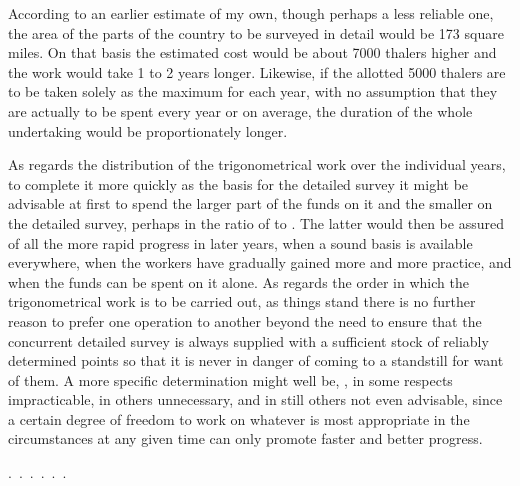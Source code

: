 According to an earlier estimate of my own, though perhaps a less reliable one,
the area of the parts of the country to be surveyed in detail would be 173
square miles. On that basis the estimated cost would be about 7000 thalers
higher and the work would take 1 to 2 years longer. Likewise, if the allotted
5000 thalers are to be taken solely as the maximum for each year, with no
assumption that they are actually to be spent every year or on average, the
duration of the whole undertaking would be proportionately longer.

As regards the distribution of the trigonometrical work over the individual
years, to complete it more quickly as the basis for the detailed survey it
might be advisable at first to spend the larger part of the funds on it and the
smaller on the detailed survey, perhaps in the ratio of  to
. The latter would then be assured of all the more rapid progress
in later years, when a sound basis is available everywhere, when the workers
have gradually gained more and more practice, and when the funds can be spent
on it alone. As regards the order in which the trigonometrical work is to be
carried out, as things stand there is no further reason to prefer one operation
to another beyond the need to ensure that the concurrent detailed survey is
always supplied with a sufficient stock of reliably determined points so that
it is never in danger of coming to a standstill for want of them. A more
specific determination might well be, , in some
respects impracticable, in others unnecessary, and in still others not even
advisable, since a certain degree of freedom to work on whatever is most
appropriate in the circumstances at any given time can only promote faster
and better progress.
\par\noindent\mbox{.\ .\ .\ .\ .\ .}\par
\medskip\noindent\hspace*{0.03\linewidth}{\footnotesize IX.}\hfill{}\par
